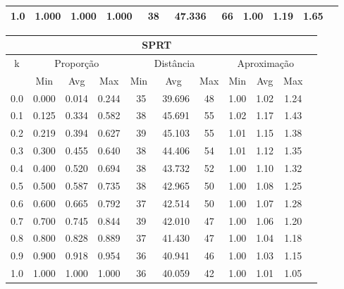 \begin{table}[!tbh]
\begin{center}
{\begin{tabular}{|c|c|c|c|c|c|c|c|c|c|c|}
1.0                & 1.000     & 1.000    & 1.000    & ~38      & ~47.336  & ~66     & 1.00    & 1.19   & 1.65            \\ \hline
\end{tabular}%
\vspace{5pt}
\begin{tabular}{|c|c|c|c|c|c|c|c|c|c|c|}
\hline
\multicolumn{10}{|c|}{\bf SPRT}                                                                                           \\ \hline
\multirow{2}{*}{k} & \multicolumn{3}{c|}{Proporção}  & \multicolumn{3}{c|}{Distância} & \multicolumn{3}{c|}{Aproximação}  \\ \cline{2-10}
                   & Min       & Avg      & Max      & Min      & Avg      & Max     & Min     & Avg    & Max             \\ \hline
0.0                & 0.000     & 0.014    & 0.244    & ~35      & ~39.696  & 48      & 1.00    & 1.02   & 1.24            \\ \hline
0.1                & 0.125     & 0.334    & 0.582    & ~38      & ~45.691  & 55      & 1.02    & 1.17   & 1.43            \\ \hline
0.2                & 0.219     & 0.394    & 0.627    & ~39      & ~45.103  & 55      & 1.01    & 1.15   & 1.38            \\ \hline
0.3                & 0.300     & 0.455    & 0.640    & ~38      & ~44.406  & 54      & 1.01    & 1.12   & 1.35            \\ \hline
0.4                & 0.400     & 0.520    & 0.694    & ~38      & ~43.732  & 52      & 1.00    & 1.10   & 1.32            \\ \hline
0.5                & 0.500     & 0.587    & 0.735    & ~38      & ~42.965  & 50      & 1.00    & 1.08   & 1.25            \\ \hline
0.6                & 0.600     & 0.665    & 0.792    & ~37      & ~42.514  & 50      & 1.00    & 1.07   & 1.28            \\ \hline
0.7                & 0.700     & 0.745    & 0.844    & ~39      & ~42.010  & 47      & 1.00    & 1.06   & 1.20            \\ \hline
0.8                & 0.800     & 0.828    & 0.889    & ~37      & ~41.430  & 47      & 1.00    & 1.04   & 1.18            \\ \hline
0.9                & 0.900     & 0.918    & 0.954    & ~36      & ~40.941  & 46      & 1.00    & 1.03   & 1.15            \\ \hline
1.0                & 1.000     & 1.000    & 1.000    & ~36      & ~40.059  & 42      & 1.00    & 1.01   & 1.05            \\ \hline
\end{tabular}%
}
\end{center}
\end{table}
